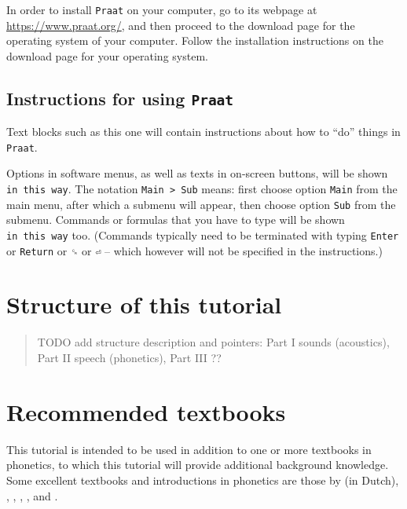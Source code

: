 \documentclass[
]{book}
\begin{document}
In order to install \texttt{Praat} on your computer, go to its webpage at \url{https://www.praat.org/}, and then proceed to the download page for the operating system of your computer. Follow the installation instructions on the download page for your operating system.

\label{tech-layout}
\subsection*{\texorpdfstring{Instructions for using \texttt{Praat}}{Instructions for using Praat}}\label{instructions-for-using-praat}

Text blocks such as this one will contain instructions about how to ``do'' things in \texttt{Praat}.

Options in software menus, as well as texts in on-screen buttons, will be shown \texttt{in\ this\ way}.
The notation \texttt{Main\ \textgreater{}\ Sub} means: first choose option \texttt{Main} from the main menu, after which a submenu will appear, then choose option \texttt{Sub} from the submenu.
Commands or formulas that you have to type will be shown \texttt{in\ this\ way} too. (Commands typically need to be terminated with typing \texttt{Enter} or \texttt{Return} or \texttt{␍} or \texttt{⏎} -- which however will not be specified in the instructions.)

\section*{Structure of this tutorial}\label{structure-of-this-tutorial}

\begin{quote}
TODO add structure description and pointers: Part I sounds (acoustics), Part II speech (phonetics), Part III ??
\end{quote}

\section{Recommended textbooks}\label{sec:textbooks}

This tutorial is intended to be used in addition to one or more textbooks in phonetics, to which this tutorial will provide additional background knowledge.
Some excellent textbooks and introductions in phonetics are those by
\citet{Rietveld_VanHeuven_2009} (in Dutch),
\citet{Johnson_2012},
\citet{Ladefoged_Johnson_2015},
\citet{Reetz_Jongman_2020},
\citet{Beňuš_2021}, and
\citet{Zsiga_2024}.
\end{document}
